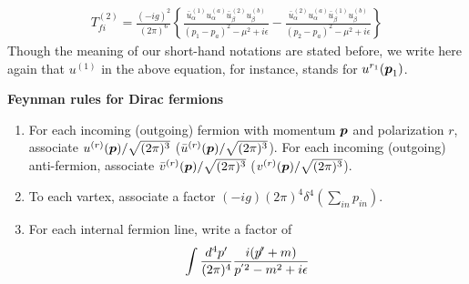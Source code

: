 \begin{eqnarray}
T^{(2)}_{fi} 
=
\frac{(-ig)^2}{(2\pi)^6}
\left\{
\frac{\bar{u}_\alpha^{(1)} u_\alpha^{(a)} \bar{u}_\beta^{(2)} u_\beta^{(b)}}
{(p_1 - p_a)^2 - \mu^2 + i\epsilon}
-
\frac{\bar{u}_\alpha^{(2)} u_\alpha^{(a)} \bar{u}_\beta^{(1)} u_\beta^{(b)}}
{(p_2 - p_a)^2 - \mu^2 + i\epsilon}
\right\}
\label{eqn:DirYukT2Feynm}
\end{eqnarray}
Though the meaning of our short-hand notations are stated before, 
we write here again that $u^{(1)}$ in the above equation, for instance,
stands for $u^{r_1}(\mbox{\boldmath $p$}_1)$.


\newpage
\noindent
{\bf Feynman rules for Dirac fermions}\\
\begin{enumerate}
\item
For each incoming (outgoing) fermion with momentum $\mbox{\boldmath $p$}$ and polarization $r$, 
associate $u^{(r)}(\mbox{\boldmath $p$})/\sqrt{(2\pi)^3}$ ($\bar{u}^{(r)}(\mbox{\boldmath $p$})/\sqrt{(2\pi)^3}$).
For each incoming (outgoing) anti-fermion, associate $\bar{v}^{(r)}(\mbox{\boldmath $p$})/\sqrt{(2\pi)^3}$ 
(${v}^{(r)}(\mbox{\boldmath $p$})/\sqrt{(2\pi)^3}$).

\item
To each vartex, associate a factor $(-ig) (2\pi)^4 \delta^4(\sum_{in} p_{in})$.

\item
For each internal fermion line, write a factor of
\begin{eqnarray}
\int \frac{d^4 p'}{(2\pi)^4}
\frac{i (\slashed{p'} + m )}{p^{'2} - m^2 + i\epsilon}
\end{eqnarray}
\end{enumerate}
